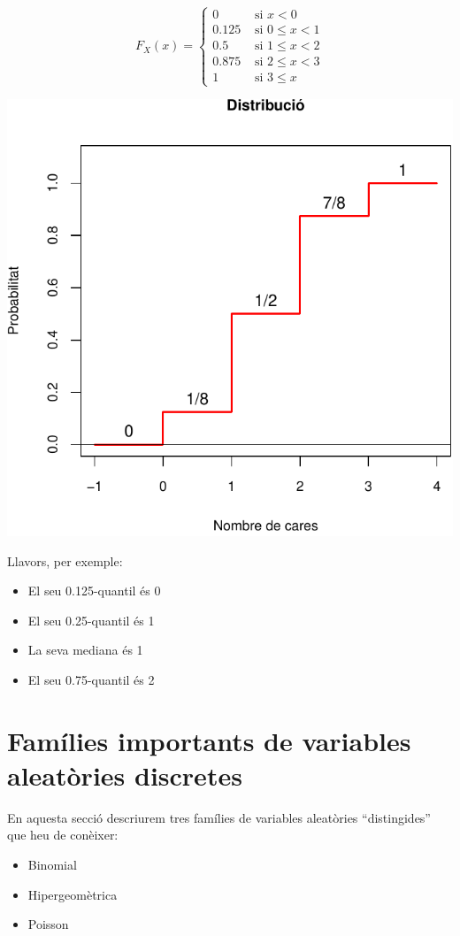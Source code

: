 \documentclass[
]{book}
\providecommand{\tightlist}{%
  \setlength{\itemsep}{0pt}\setlength{\parskip}{0pt}}
\renewcommand{\leq}{\leqslant}
\theoremstyle{definition}
\theoremstyle{definition}
\theoremstyle{definition}
\theoremstyle{remark}
\begin{document}
\[
F_X(x)=\left\{
\begin{array}{ll}
0 & \text{ si $x<0$}\\
0.125 & \text{ si $0\leq x<1$}\\
0.5 & \text{ si $1\leq x<2$}\\
0.875 & \text{ si $2\leq x<3$}\\
1 & \text{ si $3\leq x $}
\end{array}
\right.
\]

\begin{center}\includegraphics[width=0.6\linewidth]{Bioestadistica-II_files/figure-latex/unnamed-chunk-26-1} \end{center}

Llavors, per exemple:

\begin{itemize}
\item
  El seu 0.125-quantil és 0
\item
  El seu 0.25-quantil és 1
\item
  La seva mediana és 1
\item
  El seu 0.75-quantil és 2
\end{itemize}

\hypertarget{famuxedlies-importants-de-variables-aleatuxf2ries-discretes}{%
\section{Famílies importants de variables aleatòries discretes}\label{famuxedlies-importants-de-variables-aleatuxf2ries-discretes}}

En aquesta secció descriurem tres famílies de variables aleatòries ``distingides'' que heu de conèixer:

\begin{itemize}
\tightlist
\item
  Binomial
\item
  Hipergeomètrica
\item
  Poisson
\end{itemize}
\end{document}
